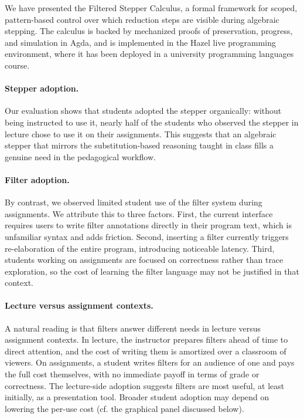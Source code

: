 We have presented the Filtered Stepper Calculus, a formal framework
for scoped, pattern-based control over which reduction steps are
visible during algebraic stepping. The calculus is backed by
mechanized proofs of preservation, progress, and simulation in Agda,
and is implemented in the Hazel live programming environment, where it
has been deployed in a university programming languages course.

\paragraph*{Stepper adoption.}
Our evaluation shows that students adopted the stepper organically:
without being instructed to use it, nearly half of the students who
observed the stepper in lecture chose to use it on their assignments.
This suggests that an algebraic stepper that mirrors the
substitution-based reasoning taught in class fills a genuine need
in the pedagogical workflow.

\paragraph*{Filter adoption.}
By contrast, we observed limited student use of the filter system
during assignments. We attribute this to three factors. First, the
current interface requires users to write filter annotations directly
in their program text, which is unfamiliar syntax and adds friction.
Second, inserting a filter currently triggers re-elaboration of the
entire program, introducing noticeable latency. Third, students
working on assignments are focused on correctness rather than trace
exploration, so the cost of learning the filter language may not be
justified in that context.

\paragraph*{Lecture versus assignment contexts.}
A natural reading is that filters answer different needs in lecture
versus assignment contexts. In lecture, the instructor prepares
filters ahead of time to direct attention, and the cost of writing
them is amortized over a classroom of viewers. On assignments, a
student writes filters for an audience of one and pays the full cost
themselves, with no immediate payoff in terms of grade or
correctness. The lecture-side adoption suggests filters are most
useful, at least initially, as a presentation tool. Broader student
adoption may depend on lowering the per-use cost (cf. the graphical
panel discussed below).


